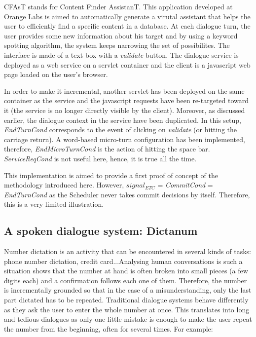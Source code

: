         CFAsT stands for Content Finder AssistanT. This application developed at Orange Labs is aimed to automatically generate a virutal assistant that helps the user to efficiently find a specific content in a database. At each dialogue turn, the user provides some new information about his target and by using a keyword spotting algorithm, the system keeps narrowing the set of possibilites. The interface is made of a text box with a \textit{validate} button. The dialogue service is deployed as a web service on a servlet container and the client is a javascript web page loaded on the user's browser.
        
        In order to make it incremental, another servlet has been deployed on the same container as the service and the javascript requests have been re-targeted toward it (the service is no longer directly visible by the client). Moreover, as discussed earlier, the dialogue context in the service have been duplicated. In this setup, \textit{EndTurnCond} corresponds to the event of clicking on \textit{validate} (or hitting the carriage return). A word-based micro-turn configuration has been implemented, therefore, \textit{EndMicroTurnCond} is the action of hitting the space bar. \textit{ServiceReqCond} is not useful here, hence, it is true all the time.
        
        This implementation is aimed to provide a first proof of concept of the methodology introduced here. However, $signal_{ETC}$ = \textit{CommitCond} = \textit{EndTurnCond} as the Scheduler never takes commit decisions by itself. Therefore, this is a very limited illustration.
    
    \subsection{A spoken dialogue system: Dictanum}
    
    	Number dictation is an activity that can be encountered in several kinds of tasks: phone number dictation, credit card...Analysing human conversations is such a situation shows that the number at hand is often broken into small pieces (a few digits each) and a confirmation follows each one of them. Therefore, the number is incrementally grounded so that in the case of a misunderstanding, only the last part dictated has to be repeated. Traditional dialogue systems behave differently as they ask the user to enter the whole number at once. This translates into long and tedious dialogues as only one little mistake is enough to make the user repeat the number from the beginning, often for several times. For example:
        
